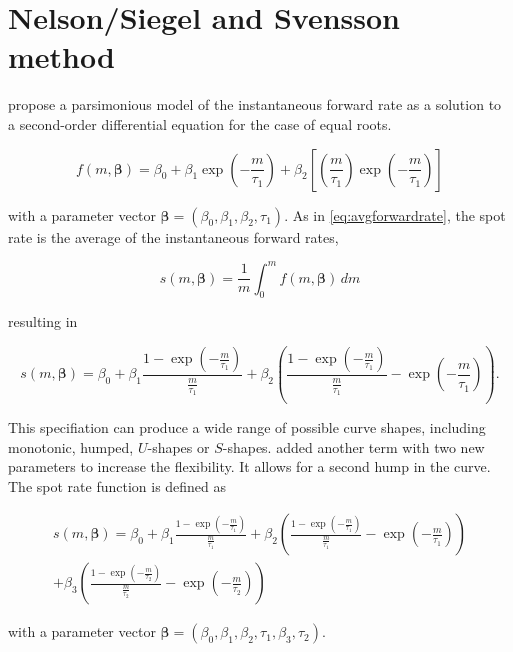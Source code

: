 \newpage
\section{Nelson/Siegel and Svensson method}
\label{sec:nels-svenss-meth}

\cite{Nelson1987} propose a parsimonious  model of  the instantaneous forward rate as a solution to a second-order differential equation for the case of equal roots.

\begin{equation}
  \label{eq:laguerre}
  f(m,\bm{\beta}) = \beta_0+\beta_1\exp\left(-\frac{m}{\tau_1}\right)+\beta_2\left[\left(\frac{m}{\tau_1}\right)\exp\left(-\frac{m}{\tau_1}\right)\right]
\end{equation}

with a parameter vector ${\bm{\beta}} = \left(\beta_0,\beta_1,\beta_2,\tau_1\right)$. As in \eqref{eq:avgforwardrate}, the spot rate is the average of the instantaneous forward rates,

\begin{equation*}
  \label{eq:intspotrate}
  s(m,\bm{\beta})=\frac{1}{m}\int_0^mf(m,\bm{\beta})\,dm
\end{equation*}

resulting in

\begin{equation}
  \label{eq:nelson-spot}
   s(m,\bm{\beta}) = \beta_0 + \beta_1\frac{1-\exp(-\frac{m}{\tau_1})}{\frac{m}{\tau_1}} + \beta_2\left(\frac{1-\exp(-\frac{m}{\tau_1})}{\frac{m}{\tau_1}} - \exp(-\frac{m}{\tau_1})\right).
\end{equation}

 
This specifiation can produce a wide range of possible curve shapes, including monotonic, humped, $U$-shapes or $S$-shapes. \cite{Svensson1994} added another term with two new parameters to increase the flexibility. It allows for a second hump in the curve. The spot rate function is defined as


\begin{multline}\label{eq:svensson-spot}
    s(m,\bm{\beta}) = \beta_0 + \beta_1\frac{1-\exp(-\frac{m}{\tau_1})}{\frac{m}{\tau_1}} + \beta_2\left(\frac{1-\exp(-\frac{m}{\tau_1})}{\frac{m}{\tau_1}} - \exp(-\frac{m}{\tau_1})\right) \\+ \beta_3\left(\frac{1-\exp(-\frac{m}{\tau_2})}{\frac{m}{\tau_2}} - \exp(-\frac{m}{\tau_2})\right)
\end{multline}



with a parameter vector ${\bm{\beta}} = \left(\beta_0,\beta_1,\beta_2,\tau_1,\beta_3,\tau_2\right)$.

